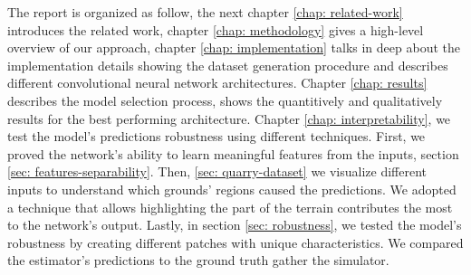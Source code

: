 \documentclass[../document.tex]{subfiles}
\begin{document}
The report is organized as follow, the next chapter \ref{chap: related-work} introduces the related work, chapter \ref{chap: methodology} gives a high-level overview of our approach, chapter \ref{chap: implementation} talks in deep about the implementation details showing the dataset generation procedure and describes different convolutional neural network architectures. Chapter \ref{chap: results} describes the model selection process, shows the quantitively and qualitatively results for the best performing architecture. Chapter \ref{chap: interpretability}, we test the model's predictions robustness using different techniques. First, we proved the network's ability to learn meaningful features from the inputs, section \ref{sec:  features-separability}. Then, \ref{sec: quarry-dataset} we visualize different inputs to understand which grounds' regions caused the predictions.  We adopted a technique that allows highlighting the part of the terrain contributes the most to the network's output. Lastly, in section \ref{sec: robustness}, we tested the model's robustness by creating different patches with unique characteristics. We compared the estimator's predictions to the ground truth gather the simulator.
\end{document}
